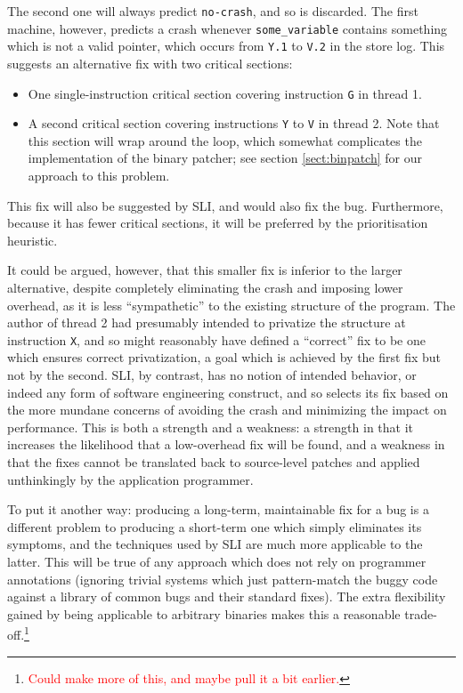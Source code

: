\documentclass[10pt,twocolumn,preprint,natbib,authoryear]{sigplanconf}
\newcommand{\editorial}[1]{\textcolor{red}{\footnote{\textcolor{red}{#1}}}}
\begin{document}
The second one will always predict \verb|no-crash|, and so is
discarded.  The first machine, however, predicts a crash whenever
\verb|some_variable| contains something which is not a valid pointer,
which occurs from \verb|Y.1| to \verb|V.2| in the store log.  This
suggests an alternative fix with two critical sections:

\begin{itemize}
\item One single-instruction critical section covering instruction
  \verb|G| in thread 1.
\item A second critical section covering instructions \verb|Y| to
  \verb|V| in thread 2.  Note that this section will wrap around the
  loop, which somewhat complicates the implementation of the binary
  patcher; see section \ref{sect:binpatch} for our approach to this
  problem.
\end{itemize}

This fix will also be suggested by SLI, and would also fix the bug.
Furthermore, because it has fewer critical sections, it will be
preferred by the prioritisation heuristic.

It could be argued, however, that this smaller fix is inferior to the
larger alternative, despite completely eliminating the crash and
imposing lower overhead, as it is less ``sympathetic'' to the existing
structure of the program.  The author of thread 2 had presumably
intended to privatize the structure at instruction \verb|X|, and so
might reasonably have defined a ``correct'' fix to be one which
ensures correct privatization, a goal which is achieved by the first
fix but not by the second.  SLI, by contrast, has no notion of
intended behavior, or indeed any form of software engineering
construct, and so selects its fix based on the more mundane concerns
of avoiding the crash and minimizing the impact on performance.  This
is both a strength and a weakness: a strength in that it increases the
likelihood that a low-overhead fix will be found, and a weakness in
that the fixes cannot be translated back to source-level patches and
applied unthinkingly by the application programmer.

To put it another way: producing a long-term, maintainable fix for a
bug is a different problem to producing a short-term one which simply
eliminates its symptoms, and the techniques used by SLI are much more
applicable to the latter.  This will be true of any approach which
does not rely on programmer annotations (ignoring trivial systems
which just pattern-match the buggy code against a library of common
bugs and their standard fixes).  The extra flexibility gained by being
applicable to arbitrary binaries makes this a reasonable
trade-off.\editorial{Could make more of this, and maybe pull it a bit
  earlier.}
\end{document}
